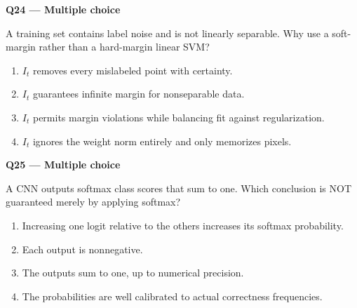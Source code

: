 \documentclass[11pt,a4paper]{article}
\begin{document}
\par\vspace{12pt}
\begin{minipage}{\linewidth}
\textbf{Q24 — Multiple choice}\par\smallskip
A training set contains label noise and is not linearly separable. Why use a soft-margin rather than a hard-margin linear SVM?
\begin{enumerate}[label=\textbf{\Alph*.}]
\item \(I_t\) removes every mislabeled point with certainty.
\item \(I_t\) guarantees infinite margin for nonseparable data.
\item \(I_t\) permits margin violations while balancing fit against regularization.
\item \(I_t\) ignores the weight norm entirely and only memorizes pixels.
\end{enumerate}
\end{minipage}
\par\vspace{12pt}
\begin{minipage}{\linewidth}
\textbf{Q25 — Multiple choice}\par\smallskip
A CNN outputs softmax class scores that sum to one. Which conclusion is NOT guaranteed merely by applying softmax?
\begin{enumerate}[label=\textbf{\Alph*.}]
\item Increasing one logit relative to the others increases its softmax probability.
\item Each output is nonnegative.
\item The outputs sum to one,\allowbreak{} up to numerical precision.
\item The probabilities are well calibrated to actual correctness frequencies.
\end{enumerate}
\end{minipage}
\par\vspace{12pt}
\end{document}
